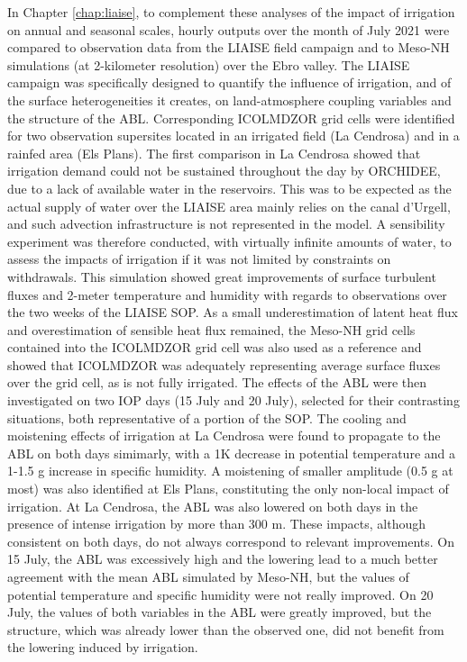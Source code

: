 In Chapter \ref{chap:liaise}, to complement these analyses of the impact of irrigation on annual and seasonal scales, hourly outputs over the month of July 2021 were compared to observation data from the LIAISE field campaign and to Meso-NH simulations (at 2-kilometer resolution) over the Ebro valley. 
The LIAISE campaign was specifically designed to quantify the influence of irrigation, and of the surface heterogeneities it creates, on land-atmosphere coupling variables and the structure of the ABL.
Corresponding ICOLMDZOR grid cells were identified for two observation supersites located in an irrigated field (La Cendrosa) and in a rainfed area (Els Plans).
The first comparison in La Cendrosa showed that irrigation demand could not be sustained throughout the day by ORCHIDEE, due to a lack of available water in the reservoirs. This was to be expected as the actual supply of water over the LIAISE area mainly relies on the canal d'Urgell, and such advection infrastructure is not represented in the model.
A sensibility experiment was therefore conducted, with virtually infinite amounts of water, to assess the impacts of irrigation if it was not limited by constraints on withdrawals.
This simulation showed great improvements of surface turbulent fluxes and 2-meter temperature and humidity with regards to observations over the two weeks of the LIAISE SOP.
As a small underestimation of latent heat flux and overestimation of sensible heat flux remained, the Meso-NH grid cells contained into the ICOLMDZOR grid cell was also used as a reference and showed that ICOLMDZOR was adequately representing average surface fluxes over the grid cell, as is not fully irrigated.
The effects of the ABL were then investigated on two IOP days (15 July and 20 July), selected for their contrasting situations, both representative of a portion of the SOP.
The cooling and moistening effects of irrigation at La Cendrosa were found to propagate to the ABL on both days simimarly, with a 1K decrease in potential temperature and a 1-1.5 g \perkg increase in specific humidity. A moistening of smaller amplitude (0.5 g \perkg at most) was also identified at Els Plans, constituting the only non-local impact of irrigation.
At La Cendrosa, the ABL was also lowered on both days in the presence of intense irrigation by more than 300 m.
These impacts, although consistent on both days, do not always correspond to relevant improvements. On 15 July, the ABL was excessively high and the lowering lead to a much better agreement with the mean ABL simulated by Meso-NH, but the values of potential temperature and specific humidity were not really improved. On 20 July, the values of both variables in the ABL were greatly improved, but the structure, which was already lower than the observed one, did not benefit from the lowering induced by irrigation.
